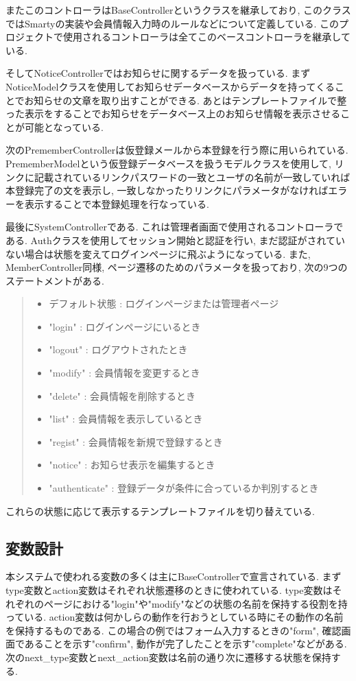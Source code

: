 \documentclass[submit,techrep]{ipsj}
\begin{document}
またこのコントローラはBaseControllerというクラスを継承しており, このクラスではSmartyの実装や会員情報入力時のルールなどについて定義している. このプロジェクトで使用されるコントローラは全てこのベースコントローラを継承している.

そしてNoticeControllerではお知らせに関するデータを扱っている. まずNoticeModelクラスを使用してお知らせデータベースからデータを持ってくることでお知らせの文章を取り出すことができる. 
あとはテンプレートファイルで整った表示をすることでお知らせをデータベース上のお知らせ情報を表示させることが可能となっている.  

次のPrememberControllerは仮登録メールから本登録を行う際に用いられている. 
PrememberModelという仮登録データベースを扱うモデルクラスを使用して, リンクに記載されているリンクパスワードの一致とユーザの名前が一致していれば本登録完了の文を表示し, 一致しなかったりリンクにパラメータがなければエラーを表示することで本登録処理を行なっている.  

最後にSystemControllerである. これは管理者画面で使用されるコントローラである. Authクラスを使用してセッション開始と認証を行い, まだ認証がされていない場合は状態を変えてログインページに飛ぶようになっている. 
また, MemberController同様, ページ遷移のためのパラメータを扱っており, 次の9つのステートメントがある.

\begin{quote}
 \begin{itemize}
 \item デフォルト状態 : ログインページまたは管理者ページ
 \item "login" : ログインページにいるとき
 \item "logout" : ログアウトされたとき
 \item "modify" : 会員情報を変更するとき
 \item "delete" : 会員情報を削除するとき
 \item "list" : 会員情報を表示しているとき
 \item "regist" : 会員情報を新規で登録するとき
 \item "notice" : お知らせ表示を編集するとき
 \item "authenticate" : 登録データが条件に合っているか判別するとき
 \end{itemize}
\end{quote}
 
 これらの状態に応じて表示するテンプレートファイルを切り替えている. 

\subsection{変数設計}
本システムで使われる変数の多くは主にBaseControllerで宣言されている. まずtype変数とaction変数はそれぞれ状態遷移のときに使われている. type変数はそれぞれのページにおける"login"や"modify"などの状態の名前を保持する役割を持っている. 
action変数は何かしらの動作を行おうとしている時にその動作の名前を保持するものである. この場合の例ではフォーム入力するときの"form", 確認画面であることを示す"confirm", 動作が完了したことを示す"complete"などがある. 
次のnext\_type変数とnext\_action変数は名前の通り次に遷移する状態を保持する. 
\end{document}

